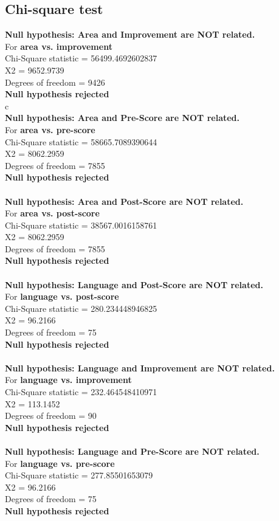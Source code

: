 \documentclass[10pt]{article}
\begin{document}
\subsection{Chi-square test}
\textbf{Null hypothesis: Area and Improvement are NOT related.} \\
 For \textbf{area vs. improvement}\\
 Chi-Square statistic = 56499.4692602837\\
 X2 = 9652.9739\\
 Degrees of freedom = 9426\\
 \textbf{Null hypothesis rejected}\\c
\\
\textbf{Null hypothesis: Area and Pre-Score are NOT related.}\\
 For \textbf{area vs. pre-score}\\
 Chi-Square statistic = 58665.7089390644\\
 X2 = 8062.2959\\
 Degrees of freedom = 7855\\
 \textbf{Null hypothesis rejected}\\
\\
\textbf{Null hypothesis: Area and Post-Score are NOT related.}\\
 For \textbf{area vs. post-score}\\
 Chi-Square statistic = 38567.0016158761\\
 X2 = 8062.2959\\
 Degrees of freedom = 7855\\
 \textbf{Null hypothesis rejected}\\
\\
\textbf{Null hypothesis: Language and Post-Score are NOT related.}\\
 For \textbf{language vs. post-score}\\
 Chi-Square statistic = 280.234448946825\\
 X2 = 96.2166\\
 Degrees of freedom = 75\\
 \textbf{Null hypothesis rejected}\\
\\
\textbf{Null hypothesis: Language and Improvement are NOT related.}\\
 For \textbf{language vs. improvement}\\
 Chi-Square statistic = 232.464548410971\\
 X2 = 113.1452\\
 Degrees of freedom = 90\\
 \textbf{Null hypothesis rejected}\\
\\
\textbf{Null hypothesis: Language and Pre-Score are NOT related.}\\
 For \textbf{language vs. pre-score}\\
 Chi-Square statistic = 277.85501653079\\
 X2 = 96.2166\\
 Degrees of freedom = 75\\
 \textbf{Null hypothesis rejected}\\
\end{document}
